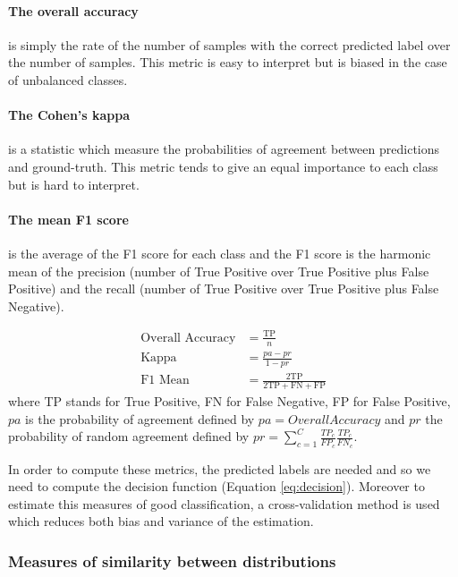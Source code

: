 \documentclass[a4paper]{article}
\begin{document}
        \paragraph{The overall accuracy} is simply the rate of the number of samples with the correct predicted label over the number of samples. This metric is easy to interpret but is biased in the case of unbalanced classes.

        \paragraph{The Cohen's kappa} is a statistic which measure the probabilities of agreement between predictions and ground-truth. This metric tends to give an equal importance to each class but is hard to interpret.

        \paragraph{The mean F1 score} is the average of the F1 score for each class and the F1 score is the harmonic mean of the precision (number of True Positive over True Positive plus False Positive) and the recall (number of True Positive over True Positive plus False Negative).

        \begin{align}
            \text{Overall Accuracy} &= \frac{\text{TP}}{n} \\
            \text{Kappa} &= \frac{pa - pr}{1 - pr}  \\
            \text{F1 Mean} &= \frac{2 \text{TP}}{2 \text{TP} + \text{FN} + \text{FP}}
        \end{align}
        where TP stands for True Positive, FN for False Negative, FP for False Positive, $pa$ is the probability of agreement defined by $pa = Overall Accuracy$  and $pr$ the probability of random agreement defined by $pr = \sum_{c=1}^{C} \frac{TP_c}{FP_c} \frac{TP_c}{FN_c}$.

        In order to compute these metrics, the predicted labels are needed and so we need to compute the decision function (Equation \ref{eq:decision}). Moreover to estimate this measures of good classification, a cross-validation method is used which reduces both bias and variance of the estimation.

        \subsubsection{Measures of similarity between distributions}
\end{document}
